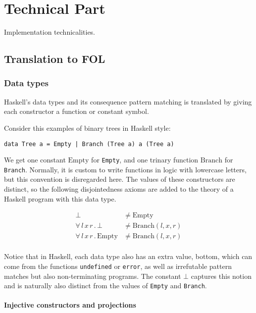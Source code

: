 \chapter{Technical Part}

Implementation technicalities.

\section{Translation to FOL}

\subsection{Data types}

Haskell's data types and its consequence pattern matching is
translated by giving each constructor a function or constant symbol.

Consider this examples of binary trees in Haskell style:

\begin{verbatim}
data Tree a = Empty | Branch (Tree a) a (Tree a)
\end{verbatim}

We get one constant $\mathrm{Empty}$ for \verb;Empty;, and one trinary
function $\mathrm{Branch}$ for \verb;Branch;. Normally, it is custom
to write functions in logic with lowercase letters, but this
convention is disregarded here. The values of these constructors are
distinct, so the following disjointedness axioms are added to the
theory of a Haskell program with this data type.

\begin{align*}
\mathrm{\bot} &  \neq \mathrm{Empty}\\
 \forall \, l \,  x \,  r \,  . \,  \mathrm{\bot} &  \neq \mathrm{Branch}(l,x,r)\\
 \forall \, l \,  x \,  r \,  . \,  \mathrm{Empty} &  \neq \mathrm{Branch}(l,x,r)\\
\end{align*}

Notice that in Haskell, each data type also has an extra value, bottom, which
can come from the functions \verb;undefined; or \verb;error;, as well as
irrefutable pattern matches but also non-terminating programs. The constant
$\bot$ captures this notion and is naturally also distinct from the values
of \verb;Empty; and \verb;Branch;.

\subsubsection{Injective constructors and projections}

